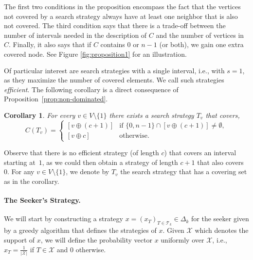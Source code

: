 \documentclass[11pt]{article}
\newtheorem{corollary}{Corollary}[section]
\newcommand\+{\mkern2mu}
\newcommand{\T}{T}
\begin{document}
The first two conditions in the proposition encompass the fact that the vertices not covered by a search strategy always have at least one neighbor that is also not covered. 
The third condition says that there is a trade-off between the number of intervals needed in the description of $C$ and the number of vertices in $C$. Finally, it also says that if $C$ contains $0$ or $n-1$ (or both), we gain one extra covered node. See Figure \ref{fig:proposition1} for an illustration.

Of particular interest are search strategies with a single interval, i.e., with $s=1$, as they maximize the number of covered elements. We call such strategies \emph{efficient}. The following corollary is a direct consequence of Proposition~\ref{prop:non-dominated}.

\begin{corollary}\label{cor:efficient}
For every $v \in V\setminus\{1\}$ there exists a search strategy $\T_v$ that covers,
$$
    C(\T_v)= \begin{cases}
        [v\oplus (c+1)] & \text{if } \{0,n-1\}\cap  [v\oplus (c+1)]\neq \emptyset,\\
        [v\oplus c] & \text{otherwise}.
    \end{cases}  
$$
\end{corollary}

Observe that there is no efficient strategy (of length $c$) that covers an interval starting at~$1$, as we could then obtain a strategy of length $c+1$ that also covers $0$. For any $v \in V\setminus\{1\}$, we denote by $\T_v$ the search strategy that has a covering set as in the corollary.

\paragraph*{The Seeker's Strategy.}


We will start by constructing a strategy $x=(x_T)_{T\in \mathcal{T}_k}\in \Delta_k$ for the seeker given by a greedy algorithm that defines the strategies of $x$. Given $\mathcal{X}$ which denotes the support of $x$, we will define the probability vector $x$ uniformly over $\mathcal{X}$, i.e., $x_T = \frac{1}{|\mathcal{X}|} $ if $ T\in \mathcal{X}$ and 0 otherwise.
\end{document}
